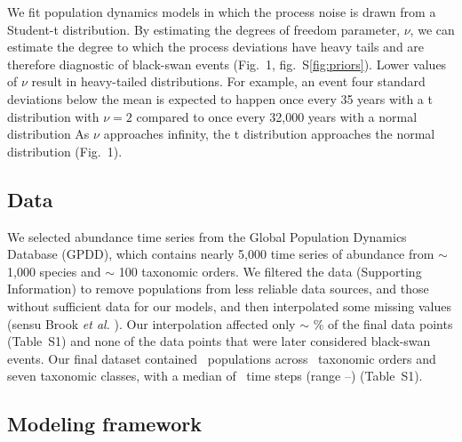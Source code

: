 We fit population dynamics models in which the process noise is
drawn from a Student-t distribution. By estimating the degrees of freedom
parameter, \(\nu\), we can estimate the degree to which the process deviations
have heavy tails and are therefore diagnostic of black-swan events (Fig.~1,
fig.~S\ref{fig:priors}). Lower values of \(\nu\) result in heavy-tailed
distributions.
For example, an event four standard deviations below the mean
is expected to happen once every 35 years with a t distribution with \(\nu = 2\)
compared to once every 32,000 years with a normal distribution
As \(\nu\) approaches infinity, the t
distribution approaches the normal distribution (Fig.~1).

\subsection{Data}

We selected abundance time series from the Global Population Dynamics
Database \citep{gpdd2010} (GPDD), which contains nearly 5,000 time series of
abundance from \(\sim\) 1,000 species and \(\sim\) 100 taxonomic orders. We
filtered the data (Supporting Information) to remove populations from less
reliable data sources, and those without sufficient data for our models, and
then interpolated some missing values (sensu Brook \textit{et
al.} \citep{brook2006a}). Our interpolation affected only \(\sim\)
\interpPointsPerc \% of the final data points (Table~S1) and none of the data
points that were later considered black-swan events. Our final dataset
contained \NPops\ populations across \NOrders\ taxonomic orders and seven
taxonomic classes, with a median of \medianTimeSteps\ time steps (range
\minTimeSteps--\maxTimeSteps) (Table~S1).

\subsection{Modeling framework}

